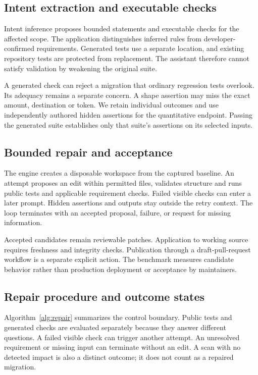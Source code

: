 \subsection{Intent extraction and executable checks}
Intent inference proposes bounded statements and executable checks for the affected scope. The application distinguishes inferred rules from developer-confirmed requirements. Generated tests use a separate location, and existing repository tests are protected from replacement. The assistant therefore cannot satisfy validation by weakening the original suite.

A generated check can reject a migration that ordinary regression tests overlook. Its adequacy remains a separate concern. A shape assertion may miss the exact amount, destination or token. We retain individual outcomes and use independently authored hidden assertions for the quantitative endpoint. Passing the generated suite establishes only that suite's assertions on its selected inputs.

\subsection{Bounded repair and acceptance}
The engine creates a disposable workspace from the captured baseline. An attempt proposes an edit within permitted files, validates structure and runs public tests and applicable requirement checks. Failed visible checks can enter a later prompt. Hidden assertions and outputs stay outside the retry context. The loop terminates with an accepted proposal, failure, or request for missing information.

Accepted candidates remain reviewable patches. Application to working source requires freshness and integrity checks. Publication through a draft-pull-request workflow is a separate explicit action. The benchmark measures candidate behavior rather than production deployment or acceptance by maintainers.

\subsection{Repair procedure and outcome states}
Algorithm~\ref{alg:repair} summarizes the control boundary. Public tests and generated checks are evaluated separately because they answer different questions. A failed visible check can trigger another attempt. An unresolved requirement or missing input can terminate without an edit. A scan with no detected impact is also a distinct outcome; it does not count as a repaired migration.

